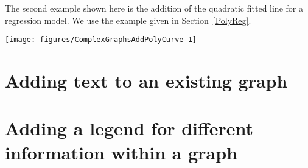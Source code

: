 The second example shown here is the addition of the quadratic fitted line for a regression model. We use the example given in Section~\ref{PolyReg}. 
\begin{knitrout}
\color{fgcolor}\begin{kframe}
\begin{alltt}
\hlstd{> } \hlkwb{=} \hlopt{~}\hlstd{,} \hlstd{=}\hlstd{),} 
\hlstd{> }\hlkwb{=}
\hlstd{> }\hlopt{~} 
\end{alltt}
\end{kframe}
\texttt{[image: figures/ComplexGraphsAddPolyCurve-1]} 
\begin{kframe}\begin{alltt}
\hlstd{> }\hlstd{(Coeffs[}\hlstd{]}\hlopt{+}\hlstd{Coeffs[}\hlstd{]}\hlopt{*}\hlopt{+}\hlstd{Coeffs[}\hlstd{]}\hlopt{*}\hlopt{^}\hlstd{,}   \hlstd{=}\hlstd{)}
\end{alltt}


{\ttfamily\noindent\bfseries{}}\end{kframe}
\end{knitrout}
 
\section{Adding text to an existing graph} 
 
 
\section{Adding a legend for different information within a graph} 
 
